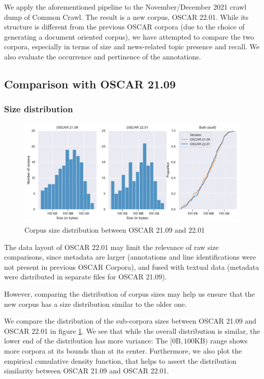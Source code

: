 We apply the aforementioned pipeline to the November/December 2021 crawl dump of Common Crawl. The result is a new corpus, OSCAR 22.01. While its structure is different from the previous OSCAR corpora (due to the choice of generating a document oriented corpus), we have attempted to compare the two corpora, especially in terms of size and news-related topic presence and recall. We also evaluate the occurrence and pertinence of the annotations.

\subsection{Comparison with OSCAR 21.09}
\subsubsection{Size distribution}

\begin{figure}[!ht]
    \begin{center}
        \includegraphics[width=\linewidth]{static/media/oscar/towards/size-comp}
        \caption{Corpus size distribution between OSCAR 21.09 and 22.01}
        \label{fig.1}
    \end{center}
\end{figure}

The data layout of OSCAR 22.01 may limit the relevance of raw size comparisons, since metadata are larger (annotations and line identifications were not present in previous OSCAR Corpora), and fused with textual data (metadata were distributed in separate files for OSCAR 21.09).

However, comparing the distribution of corpus sizes may help us ensure that the new corpus has a size distribution similar to the older one.

We compare the distribution of the sub-corpora sizes between OSCAR 21.09 and OSCAR 22.01 in figure \ref{fig.1}. We see that while the overall distribution is similar, the lower end of the distribution has more variance: The $[0\text{B}, 100\text{KB})$ range shows more corpora at its bounds than at its center. Furthermore, we also plot the empirical cumulative density function, that helps to assert the distribution similarity between OSCAR 21.09 and OSCAR 22.01.

